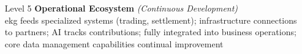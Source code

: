 \begin{itemize}[leftmargin=0.5in,font=\bfseries]
    \item [Level 5] \textbf{Operational Ecosystem} \textit{(Continuous Development)}
    ~\\\acrshort{ekg} feeds specialized systems (trading, settlement);
    infrastructure connections to partners;
    AI tracks contributions;
    fully integrated into business operations;
    core data management capabilities continual improvement\\[0.5em]

\end{itemize}
